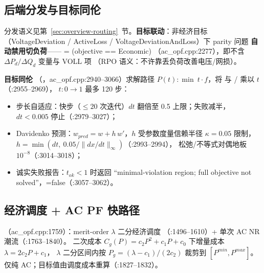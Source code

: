 \subsection{后端分发与目标同伦}
分发语义见第~\ref{sec:overview-routing}~节。\textbf{目标联动}：非经济目标
（VoltageDeviation / ActiveLoss / VoltageDeviationAndLoss）下 parity 问题
\textbf{自动禁用切负荷}—— = (objective == Economic)
（ac\_opf.cpp:2277），即不含 $\Delta P_d/\Delta Q_d$ 变量与 VOLL 项
（RPO 语义：不许靠丢负荷改善电压/网损）。

\textbf{目标同伦}
（，ac\_opf.cpp:2940--3066）求解路径
$P(t):\min\ t\cdot f$，将  与
/ 乘以 $t$（:2955--2969），
$t:0\to1$ 最多 120 步：
\begin{itemize}
  \item 步长自适应：快步（$\le20$ 次迭代）$dt$ 翻倍至 0.5 上限；失败减半，
        $dt<0.005$ 停止（:2979--3027）；
  \item Davidenko 预测：$w_{pred}=w+h\,w'$，$h$ 受参数度量信赖半径 $\kappa=0.05$ 限制，
        $h=\min(dt,\ 0.05/\lVert dx/dt\rVert_\infty)$（:2993--2994），
        松弛/不等式对偶地板 $10^{-8}$（:3014--3018）；
  \item 诚实失败报告：$t_{ok}<1$ 时返回 ``minimal-violation region; full objective not
        solved''，=false（:3057--3062）。
\end{itemize}

\subsection{经济调度 + AC PF 快路径}
（ac\_opf.cpp:1759）：merit-order $\lambda$ 二分经济调度
（:1496--1610）+ 单次 AC NR 潮流（:1763--1840）。
二次成本 $C_g(P)=c_2P^2+c_1P+c_0$ 下增量成本 $\lambda=2c_2P+c_1$，
$\lambda$ 二分区间内按 $P_g=(\lambda-c_1)/(2c_2)$ 裁剪到 $[P^{min},P^{max}]$。
仅纯 AC；目标值由调度成本重算（:1827--1832）。

